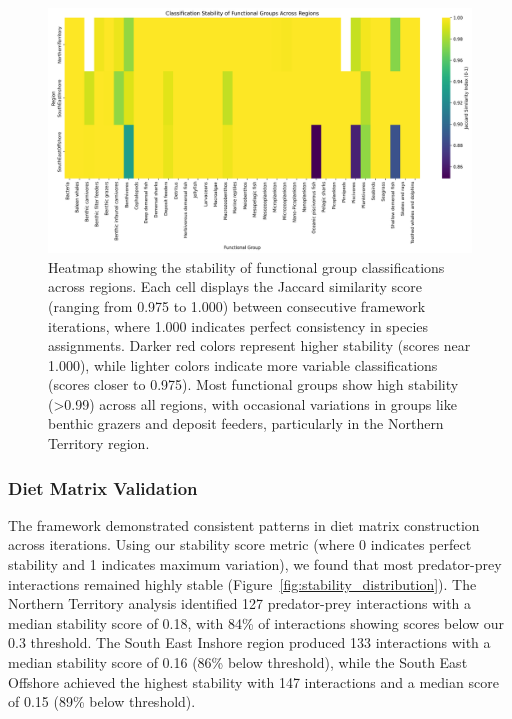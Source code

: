 \begin{figure}[htbp]
    \centering
    \includegraphics[width=\textwidth]{figures/group_stability_heatmap.png}
    \caption{Heatmap showing the stability of functional group classifications across regions. Each cell displays the Jaccard similarity score (ranging from 0.975 to 1.000) between consecutive framework iterations, where 1.000 indicates perfect consistency in species assignments. Darker red colors represent higher stability (scores near 1.000), while lighter colors indicate more variable classifications (scores closer to 0.975). Most functional groups show high stability (>0.99) across all regions, with occasional variations in groups like benthic grazers and deposit feeders, particularly in the Northern Territory region.}
    \label{fig:stability_heatmap}
\end{figure}



\subsubsection{Diet Matrix Validation}
The framework demonstrated consistent patterns in diet matrix construction across iterations. Using our stability score metric (where 0 indicates perfect stability and 1 indicates maximum variation), we found that most predator-prey interactions remained highly stable (Figure~\ref{fig:stability_distribution}). The Northern Territory analysis identified 127 predator-prey interactions with a median stability score of 0.18, with 84\% of interactions showing scores below our 0.3 threshold. The South East Inshore region produced 133 interactions with a median stability score of 0.16 (86\% below threshold), while the South East Offshore achieved the highest stability with 147 interactions and a median score of 0.15 (89\% below threshold).

